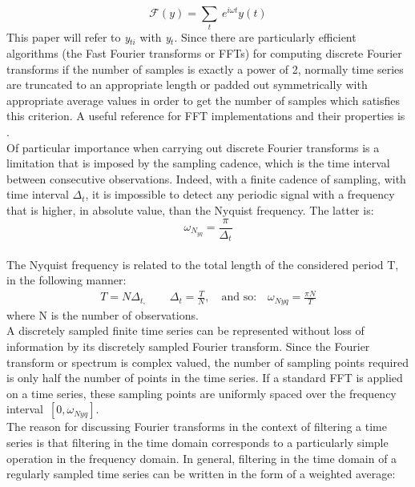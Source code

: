 \documentclass[english,blauw]{cbsdiscussionpaper}
\begin{document}
\begin{equation}
\mathcal{F}(y) = \sum_t  \ e^{i \omega t} y(\textit{t})
\end{equation}
This paper will refer to \textit{y$_{ti}$} with \textit{y$_t$}. Since there are particularly efficient algorithms (the Fast Fourier transforms or FFTs) for computing discrete Fourier transforms if the number of samples is exactly a power of 2, normally time series are truncated to an appropriate length or padded out symmetrically with appropriate average values in order to get the number of samples which satisfies this criterion. A useful reference for FFT implementations and their properties is \citep{presea1992}.\\Of particular importance when carrying out discrete Fourier transforms is a limitation that is imposed by the sampling cadence, which is the time interval between consecutive observations. Indeed, with a finite cadence of sampling, with time interval $\Delta_t$, it is impossible to detect any periodic signal with a frequency that is higher, in absolute value, than the Nyquist frequency. The latter is:
\begin{equation}
\omega_{N_{yq}} = \frac {\pi}{\Delta_t}
\end{equation}\\
The Nyquist frequency is related to the total length of the considered period T, in the following manner:
\begin{equation*}
\begin{split}
T=N\Delta_{t,}\quad \quad \Delta_{t}=\frac{T}{N},\quad \text{and so:} \quad \omega_{Nyq}=\frac{\pi N}{T}
\end{split}
\end{equation*}
where N is the number of observations.\\
A discretely sampled finite time series can be represented without loss of information by its discretely sampled Fourier transform. Since the Fourier transform or spectrum is complex valued, the number of sampling points required is only half the number of points in the time series. If a standard FFT is applied on a time series, these sampling points are uniformly spaced over the frequency interval\ $[0,\omega_{Nyq}]$.\\The reason for discussing Fourier transforms in the context of filtering a time series is that filtering in the time domain corresponds to a particularly simple operation in the frequency domain. In general, filtering in the time domain of a regularly sampled time series can be written in the form of a weighted average:
\end{document}
